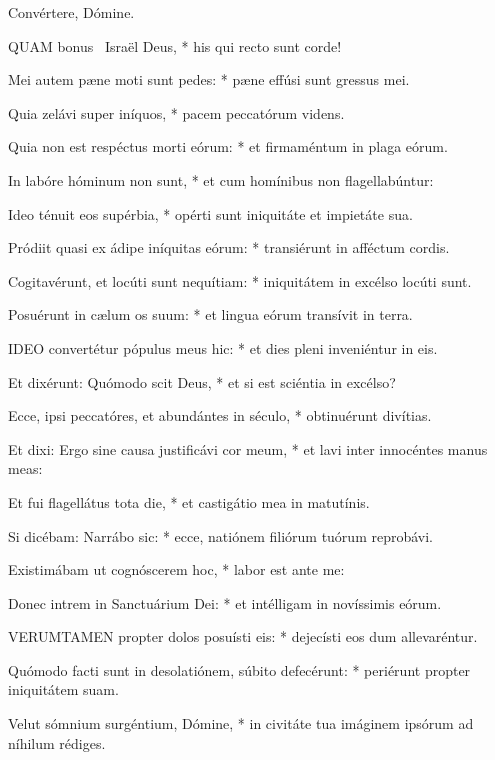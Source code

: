   Convértere, Dómine.


\lettrine[lines=2]{Q}{UAM} bonus \textdagger\ Israël Deus, * his qui recto sunt corde!

Mei autem pæne moti sunt pedes: * pæne effúsi sunt gressus mei.

Quia zelávi super iníquos, * pacem peccatórum videns.

Quia non est respéctus morti eórum: * et firmaméntum in plaga eórum.

In labóre hóminum non sunt, * et cum homínibus non flagellabúntur:

Ideo ténuit eos supérbia, * opérti sunt iniquitáte et impietáte sua.

Pródiit quasi ex ádipe iníquitas eórum: * transiérunt in afféctum cordis.

Cogitavérunt, et locúti sunt nequítiam: * iniquitátem in excélso locúti sunt.

Posuérunt in cælum os suum: * et lingua eórum transívit in terra.


\lettrine[lines=2]{I}{DEO} convertétur pópulus meus hic: * et dies pleni inveniéntur in eis.

Et dixérunt: Quómodo scit Deus, * et si est sciéntia in excélso?

Ecce, ipsi peccatóres, et abundántes in século, * obtinuérunt divítias.

Et dixi: Ergo sine causa justificávi cor meum, * et lavi inter innocéntes manus meas:

Et fui flagellátus tota die, * et castigátio mea in matutínis.

Si dicébam: Narrábo sic: * ecce, natiónem filiórum tuórum reprobávi.

Existimábam ut cognóscerem hoc, * labor est ante me:

Donec intrem in Sanctuárium Dei: * et intélligam in novíssimis eórum.


\lettrine[lines=2]{V}{ERUMTAMEN} propter dolos posuísti eis: * dejecísti eos dum allevaréntur.

Quómodo facti sunt in desolatiónem, súbito defecérunt: * periérunt propter iniquitátem suam.

Velut sómnium surgéntium, Dómine, * in civitáte tua imáginem ipsórum ad níhilum rédiges.

